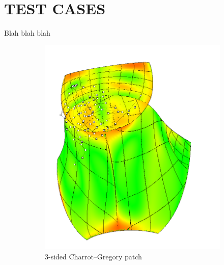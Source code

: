 \documentclass[9pt,academicons]{article}
\begin{document}
\section{TEST CASES}
\label{sec:tests}
Blah blah blah
\begin{figure}
  {
    \hfill
    \begin{subfigure}{.3\textwidth}
      \centering
      \includegraphics[width=\textwidth]{images/cagd86/cg3.png}
      \caption{3-sided Charrot--Gregory patch}
      \label{fig:cagd86-3-cg}
    \end{subfigure}
    \hfill
    \begin{subfigure}{.3\textwidth}
      \centering

\end{subfigure}}
\end{figure}
\end{document}
